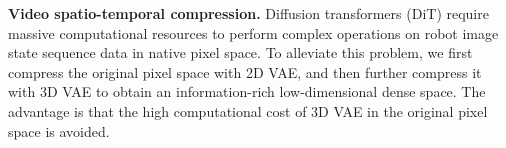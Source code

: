 \textbf{Video spatio-temporal compression.} 
Diffusion transformers (DiT) require massive computational resources to perform complex operations on robot image state sequence data in native pixel space.
To alleviate this problem, we first compress the original pixel space with 2D VAE, and then further compress it with 3D VAE to obtain an information-rich low-dimensional dense space.
The advantage is that the high computational cost of 3D VAE in the original pixel space is avoided. 

